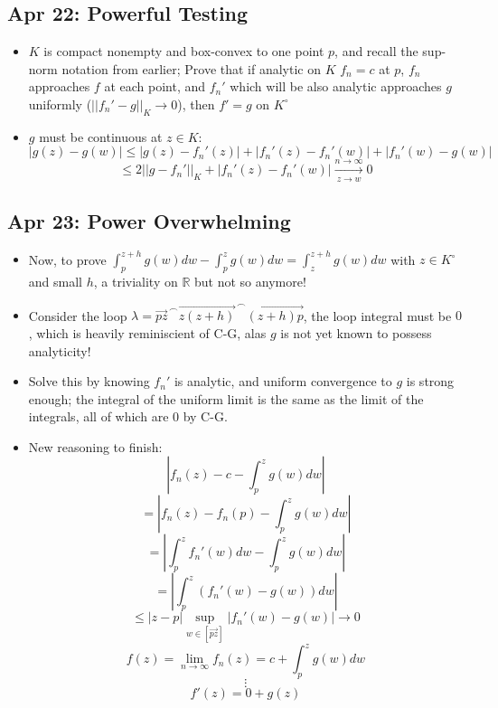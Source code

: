 \documentclass[10pt, oneside]{article}
\newcommand{\lti}[1]{\lim_{#1 \rightarrow \infty}}
\newcommand{\cat}{^{\,\smallfrown}}
\let\leq\leqslant
\newcommand{\R}{\mathbb{R}}
\begin{document}
\subsection{Apr 22: Powerful Testing}
\begin{itemize}
    \item $K$ is compact nonempty and box-convex to one point $p$, and recall the sup-norm notation from earlier; Prove that if analytic on $K$ $f_n = c$ at $p$, $f_n$ approaches $f$ at each point, and $f_n'$ which will be also analytic approaches $g$ uniformly ($||f_n' - g||_K \rightarrow 0$), then $f' = g$ on $K^\circ$
    \item $g$ must be continuous at $z \in K$: 
            \[|g(z) - g(w)| \leq |g(z) - f_n'(z)| + |f_n'(z) - f_n'(w)| + |f_n'(w) - g(w)|\]
            \[\leq 2||g - f_n'||_K +|f_n'(z) - f_n'(w)| \overset{n \rightarrow \infty}{\underset{z \rightarrow w}{\longrightarrow}} 0\]
\end{itemize}

\subsection{Apr 23: Power Overwhelming}
\begin{itemize}
    \item Now, to prove $\int_p^{z+h} g(w) dw - \int_p^z g(w) dw = \int_z^{z+h} g(w) dw$ with $z \in K^\circ$ and small $h$, a triviality on $\R$ but not so anymore!
    \item Consider the loop $\lambda = \overrightarrow{pz}\cat\overrightarrow{z(z+h)}\cat\overrightarrow{(z+h)p}$, the loop integral must be $0$, which is heavily reminiscient of C-G, alas $g$ is not yet known to possess analyticity!
    \item Solve this by knowing $f_n'$ is analytic, and uniform convergence to $g$ is strong enough; the integral of the uniform limit is the same as the limit of the integrals, all of which are $0$ by C-G.
    \item New reasoning to finish:
            \[\left|f_n(z) - c - \int_p^z g(w) dw\right|\]
            \[= \left|f_n(z) - f_n(p) - \int_p^z g(w) dw\right|\]
            \[= \left|\int_p^z f_n'(w) dw - \int_p^z g(w) dw\right|\]
            \[= \left|\int_p^z (f_n'(w) - g(w)) dw\right|\]
            \[\leq |z-p| \sup_{w \in [\overrightarrow{pz}]} |f_n'(w) - g(w)|\rightarrow 0\]
            \[f(z) = \lti{n} f_n(z) = c + \int_p^z g(w) dw\]
            \[\vdots\]
            \[f'(z) = 0 + g(z)\]
\end{itemize}
\end{document}
